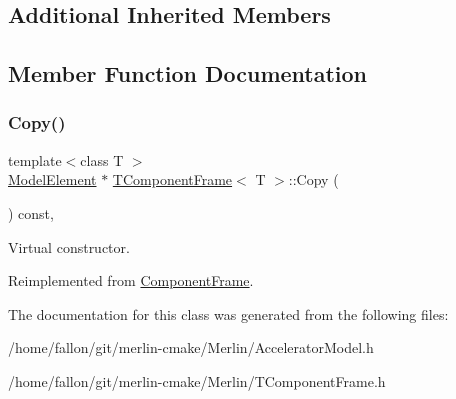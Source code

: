 \subsection*{Additional Inherited Members}


\subsection{Member Function Documentation}
\mbox{\label{classTComponentFrame_a83b3faa024200e7d628451e1f8b50900}} 
\subsubsection{\texorpdfstring{Copy()}{Copy()}}
{\footnotesize\ttfamily template$<$class T $>$ \\
\hyperlink{classModelElement}{Model\+Element} $\ast$ \hyperlink{classTComponentFrame}{T\+Component\+Frame}$<$ T $>$\+::Copy (\begin{DoxyParamCaption}{ }\end{DoxyParamCaption}) const\hspace{0.3cm}{\ttfamily [inline]}, {\ttfamily [virtual]}}

Virtual constructor. 

Reimplemented from \hyperlink{classComponentFrame_a24f6aea39b57e4b10a764877d1be6b7f}{Component\+Frame}.



The documentation for this class was generated from the following files\+:\begin{DoxyCompactItemize}
\item 
/home/fallon/git/merlin-\/cmake/\+Merlin/Accelerator\+Model.\+h\item 
/home/fallon/git/merlin-\/cmake/\+Merlin/T\+Component\+Frame.\+h\end{DoxyCompactItemize}
